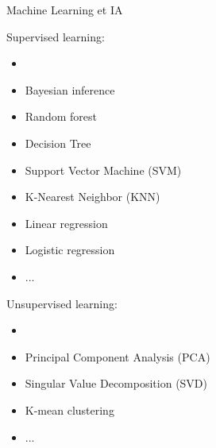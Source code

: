 \documentclass[10pt,serif,mathserif,compress,hyperref={colorlinks}]{beamer}
\begin{document}
\begin{frame}{Machine Learning et IA}

  
  \begin{tcolorbox}[title=Beaucoup d'approches possibles pour les algorithmes de {\em Machine Learning}]
    {\small
      \begin{minipage}[t]{.55\textwidth}
        Supervised learning:
        \begin{itemize}
        \item {}
        \item Bayesian inference
        \item Random forest
        \item Decision Tree
        \item Support Vector Machine (SVM)
        \item K-Nearest Neighbor (KNN)
        \item Linear regression
        \item Logistic regression
        \item ...
        \end{itemize}
      \end{minipage}\begin{minipage}[t]{.5\textwidth}
        Unsupervised learning:
        \begin{itemize}
        \item {}
        \item Principal Component Analysis (PCA)
        \item Singular Value Decomposition (SVD)
        \item K-mean clustering
        \item ...
        \end{itemize}
      \end{minipage}
    }
  \end{tcolorbox}    
  
  
  \bigskip
\end{frame}
\end{document}
